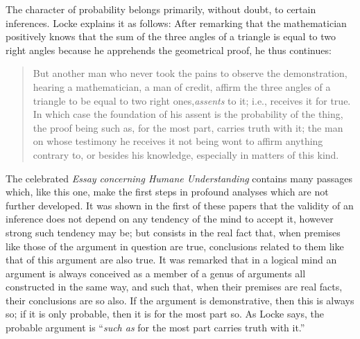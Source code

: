 The character of probability belongs primarily, without doubt, to certain inferences. Locke explains it as follows: After remarking that the mathematician positively knows that the sum of the three angles of a triangle is equal to two right angles because he apprehends the geometrical proof, he thus continues: \begin{quote}
But another man who never took the pains to observe the demonstration, hearing a mathematician, a man of credit, affirm the three angles of a triangle to be equal to two right ones,\emph{assents} to it; {i.e.}, receives it for true. In which case the foundation of his assent is the probability of the thing, the proof being such as, for the most part, carries truth with it; the man on whose testimony he receives it not being wont to affirm anything contrary to, or besides his knowledge, especially in matters of this kind.
\end{quote}
The celebrated \emph{Essay concerning Humane Understanding} contains many passages which, like this one, make the first steps in profound analyses which are not further developed. It was shown in the first of these papers that the validity of an inference does not depend on any tendency of the mind to accept it, however strong such tendency may be; but consists in the real fact that, when premises like those of the argument in question are true, conclusions related to them like that of this argument are also true. It was remarked that in a logical mind an argument is always conceived as a member of a genus of arguments all constructed in the same way, and such that, when their premises are real facts, their conclusions are so also. If the argument is demonstrative, then this is always so; if it is only probable, then it is for the most part so. As Locke says, the probable argument is ``\emph{such as} for the most part carries truth with it.''

